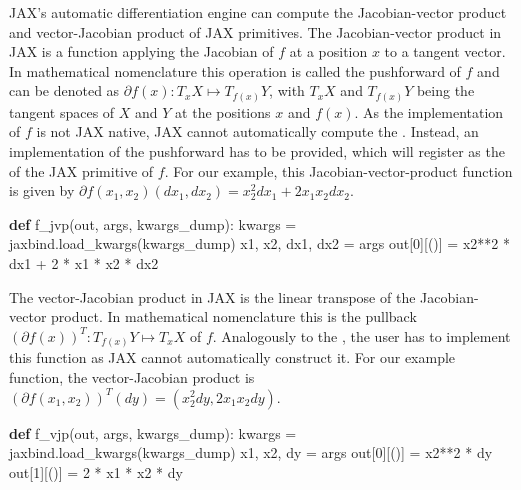 \documentclass[10pt,a4paper,onecolumn]{article}
\let\textttOrig=\texttt
\def\texttt#1{\expandafter\textttOrig{\seqsplit{#1}}}
\newenvironment{Shaded}{}{}
\newcommand{\DecValTok}[1]{\textcolor[rgb]{0.25,0.63,0.44}{#1}}
\newcommand{\KeywordTok}[1]{\textcolor[rgb]{0.00,0.44,0.13}{\textbf{#1}}}
\newcommand{\NormalTok}[1]{#1}
\newcommand{\OperatorTok}[1]{\textcolor[rgb]{0.40,0.40,0.40}{#1}}
\begin{document}
JAX's automatic differentiation engine can compute the Jacobian-vector
product \texttt{jvp} and vector-Jacobian product \texttt{vjp} of JAX
primitives. The Jacobian-vector product in JAX is a function applying
the Jacobian of \(f\) at a position \(x\) to a tangent vector. In
mathematical nomenclature this operation is called the pushforward of
\(f\) and can be denoted as \(\partial f(x): T_x X \mapsto T_{f(x)} Y\),
with \(T_x X\) and \(T_{f(x)} Y\) being the tangent spaces of \(X\) and
\(Y\) at the positions \(x\) and \(f(x)\). As the implementation of
\(f\) is not JAX native, JAX cannot automatically compute the
\texttt{jvp}. Instead, an implementation of the pushforward has to be
provided, which \texttt{JAXbind} will register as the \texttt{jvp} of
the JAX primitive of \(f\). For our example, this
Jacobian-vector-product function is given by
\(\partial f(x_1,x_2)(dx_1,dx_2) = x_2^2dx_1 + 2x_1x_2dx_2\).

\begin{Shaded}
\begin{Highlighting}[]
\KeywordTok{def}\NormalTok{ f\_jvp(out, args, kwargs\_dump):}
\NormalTok{    kwargs }\OperatorTok{=}\NormalTok{ jaxbind.load\_kwargs(kwargs\_dump)}
\NormalTok{    x1, x2, dx1, dx2 }\OperatorTok{=}\NormalTok{ args}
\NormalTok{    out[}\DecValTok{0}\NormalTok{][()] }\OperatorTok{=}\NormalTok{ x2}\OperatorTok{**}\DecValTok{2} \OperatorTok{*}\NormalTok{ dx1 }\OperatorTok{+} \DecValTok{2} \OperatorTok{*}\NormalTok{ x1 }\OperatorTok{*}\NormalTok{ x2 }\OperatorTok{*}\NormalTok{ dx2}
\end{Highlighting}
\end{Shaded}

The vector-Jacobian product \texttt{vjp} in JAX is the linear transpose
of the Jacobian-vector product. In mathematical nomenclature this is the
pullback \((\partial f(x))^{T}: T_{f(x)}Y \mapsto T_x X\) of \(f\).
Analogously to the \texttt{jvp}, the user has to implement this function
as JAX cannot automatically construct it. For our example function, the
vector-Jacobian product is
\((\partial f(x_1,x_2))^{T}(dy) = (x_2^2dy, 2x_1x_2dy)\).

\begin{Shaded}
\begin{Highlighting}[]
\KeywordTok{def}\NormalTok{ f\_vjp(out, args, kwargs\_dump):}
\NormalTok{    kwargs }\OperatorTok{=}\NormalTok{ jaxbind.load\_kwargs(kwargs\_dump)}
\NormalTok{    x1, x2, dy }\OperatorTok{=}\NormalTok{ args}
\NormalTok{    out[}\DecValTok{0}\NormalTok{][()] }\OperatorTok{=}\NormalTok{ x2}\OperatorTok{**}\DecValTok{2} \OperatorTok{*}\NormalTok{ dy}
\NormalTok{    out[}\DecValTok{1}\NormalTok{][()] }\OperatorTok{=} \DecValTok{2} \OperatorTok{*}\NormalTok{ x1 }\OperatorTok{*}\NormalTok{ x2 }\OperatorTok{*}\NormalTok{ dy}
\end{Highlighting}
\end{Shaded}
\end{document}
